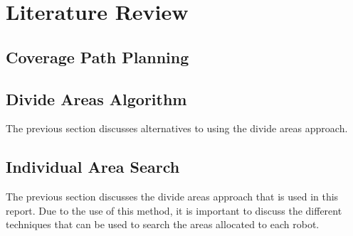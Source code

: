 \chapter{Literature Review}
\label{chp:back}


\section{Coverage Path Planning}

\section{Divide Areas Algorithm}
The previous section discusses alternatives to using the divide areas approach. 

\section{Individual Area Search}
The previous section discusses the divide areas approach that is used in this report. Due to the use of this method, it is important to discuss the different techniques that can be used to search the areas allocated to each robot. 



